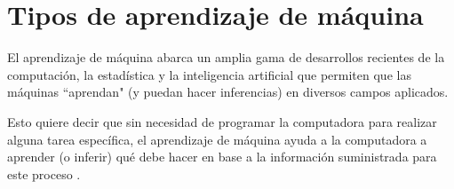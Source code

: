 \documentclass[12pt,letterpaper,final, openany]{scrbook}
\begin{document}


\section{Tipos de aprendizaje de máquina}

El aprendizaje de máquina abarca un amplia gama de desarrollos recientes de la computación, la estadística y la inteligencia artificial que permiten que las máquinas ``aprendan" (y puedan hacer inferencias) en diversos campos aplicados.

Esto quiere decir que sin necesidad de programar la computadora para realizar alguna tarea específica, el aprendizaje de máquina ayuda a la computadora a aprender (o inferir) qué debe hacer en base a la información suministrada para este proceso \cite{chatterjee_machine_2021}.

\end{document}
